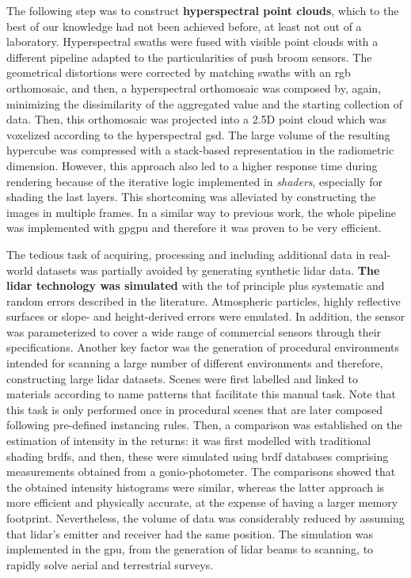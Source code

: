 The following step was to construct \textbf{hyperspectral point clouds}, which to the best of our knowledge had not been achieved before, at least not out of a laboratory. Hyperspectral swaths were fused with visible point clouds with a different pipeline adapted to the particularities of push broom sensors. The geometrical distortions were corrected by matching swaths with an \acrshort{rgb} orthomosaic, and then, a hyperspectral orthomosaic was composed by, again, minimizing the dissimilarity of the aggregated value and the starting collection of data. Then, this orthomosaic was projected into a 2.5D point cloud which was voxelized according to the hyperspectral \acrshort{gsd}. The large volume of the resulting hypercube was compressed with a stack-based representation in the radiometric dimension. However, this approach also led to a higher response time during rendering because of the iterative logic implemented in \textit{shaders}, especially for shading the last layers. This shortcoming was alleviated by constructing the images in multiple frames. In a similar way to previous work, the whole pipeline was implemented with \acrshort{gpgpu} and therefore it was proven to be very efficient.

The tedious task of acquiring, processing and including additional data in real-world datasets was partially avoided by generating synthetic \acrshort{lidar} data. \textbf{The \acrshort{lidar} technology was simulated} with the \acrshort{tof} principle plus systematic and random errors described in the literature. Atmospheric particles, highly reflective surfaces or slope- and height-derived errors were emulated. In addition, the sensor was parameterized to cover a wide range of commercial sensors through their specifications. Another key factor was the generation of procedural environments intended for scanning a large number of different environments and therefore, constructing large \acrshort{lidar} datasets. Scenes were first labelled and linked to materials according to name patterns that facilitate this manual task. Note that this task is only performed once in procedural scenes that are later composed following pre-defined instancing rules. Then, a comparison was established on the estimation of intensity in the returns: it was first modelled with traditional shading \acrshort{brdf}s, and then, these were simulated using \acrshort{brdf} databases comprising measurements obtained from a gonio-photometer. The comparisons showed that the obtained intensity histograms were similar, whereas the latter approach is more efficient and physically accurate, at the expense of having a larger memory footprint. Nevertheless, the volume of data was considerably reduced by assuming that \acrshort{lidar}'s emitter and receiver had the same position. The simulation was implemented in the \acrshort{gpu}, from the generation of \acrshort{lidar} beams to scanning, to rapidly solve aerial and terrestrial surveys. 

